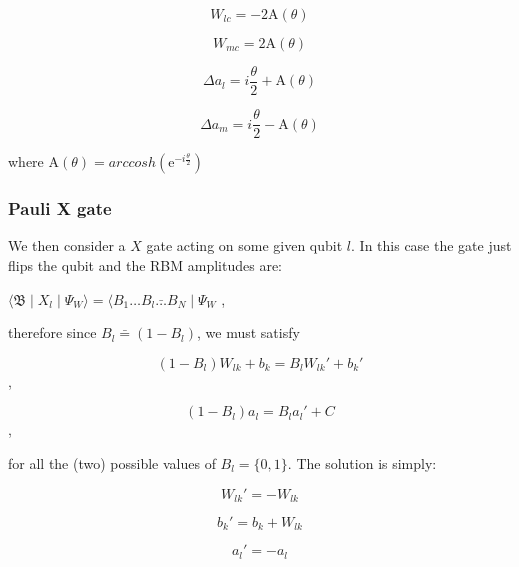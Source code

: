 \begin{equation}
   W_{lc} = -2\mathrm{A}(\theta) 
\end{equation}

\begin{equation}
   W_{mc} = 2\mathrm{A}(\theta) 
\end{equation}

\begin{equation}
   \Delta a_{l} = i \frac{\theta}{2} + \mathrm{A}(\theta)
\end{equation}

\begin{equation}
   \Delta a_{m} = i \frac{\theta}{2} - \mathrm{A}(\theta)
\end{equation}

where $\mathrm{A}(\theta) = arccosh(\mathrm{e}^{-i \frac{\theta}{2}})$

\subsubsection{Pauli X gate}
We then consider a $X$ gate acting on some given qubit $l$. In this case the gate just flips the qubit
and the RBM amplitudes are:

$
    \langle \mathfrak{B} \mid X_{l} \mid \Psi_{W}  \rangle = 
    \langle B_{1} \dots B_{l}\bar \dots B_{N} \mid \Psi_{W}
$
,

therefore since $B_{l}\bar = (1-B_{l})$, we must satisfy 

\begin{equation}
    (1-B_{l})W_{lk} + b_{k} = B_{l} W_{lk}\prime + b_{k}\prime
\end{equation},

\begin{equation}
   (1-B_{l}) a_{l} = B_{l} a_{l}\prime + C 
\end{equation},

for all the (two) possible values of $B_{l} = \{0,1\}$. The solution is simply:

\begin{equation}
   W_{lk}\prime = -W_{lk}
\end{equation}

\begin{equation}
   b_{k}\prime = b_{k} + W_{lk}
\end{equation}

\begin{equation}
   a_{l}\prime = -a_{l}
\end{equation}


